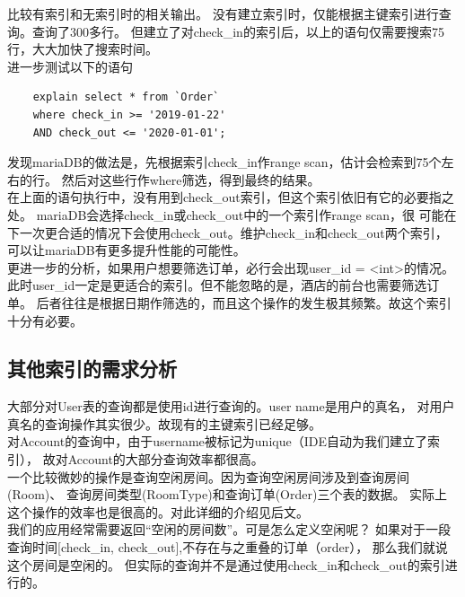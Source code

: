 \documentclass{myreport}
\begin{document}
比较有索引和无索引时的相关输出。
没有建立索引时，仅能根据主键索引进行查询。查询了300多行。
但建立了对check\_in的索引后，以上的语句仅需要搜索75行，大大加快了搜索时间。\\

进一步测试以下的语句\\

\begin{verbatim}
    explain select * from `Order`
    where check_in >= '2019-01-22'
    AND check_out <= '2020-01-01';
\end{verbatim}


发现mariaDB的做法是，先根据索引check\_in作range scan，估计会检索到75个左右的行。
然后对这些行作where筛选，得到最终的结果。\\

在上面的语句执行中，没有用到check\_out索引，但这个索引依旧有它的必要指之处。
mariaDB会选择check\_in或check\_out中的一个索引作range scan，很
可能在下一次更合适的情况下会使用check\_out。维护check\_in和check\_out两个索引，
可以让mariaDB有更多提升性能的可能性。\\

更进一步的分析，如果用户想要筛选订单，必行会出现user\_id = <int>的情况。
此时user\_id一定是更适合的索引。但不能忽略的是，酒店的前台也需要筛选订单。
后者往往是根据日期作筛选的，而且这个操作的发生极其频繁。故这个索引十分有必要。\\

\subsection{其他索引的需求分析}
大部分对User表的查询都是使用id进行查询的。user name是用户的真名，
对用户真名的查询操作其实很少。故现有的主键索引已经足够。\\

对Account的查询中，由于username被标记为unique（IDE自动为我们建立了索引），
故对Account的大部分查询效率都很高。\\

一个比较微妙的操作是查询空闲房间。因为查询空闲房间涉及到查询房间(Room)、
查询房间类型(RoomType)和查询订单(Order)三个表的数据。
实际上这个操作的效率也是很高的。对此详细的介绍见后文。\\


我们的应用经常需要返回``空闲的房间数''。可是怎么定义空闲呢？
如果对于一段查询时间[check\_in, check\_out],不存在与之重叠的订单（order），
那么我们就说这个房间是空闲的。
但实际的查询并不是通过使用check\_in和check\_out的索引进行的。\\
\end{document}
